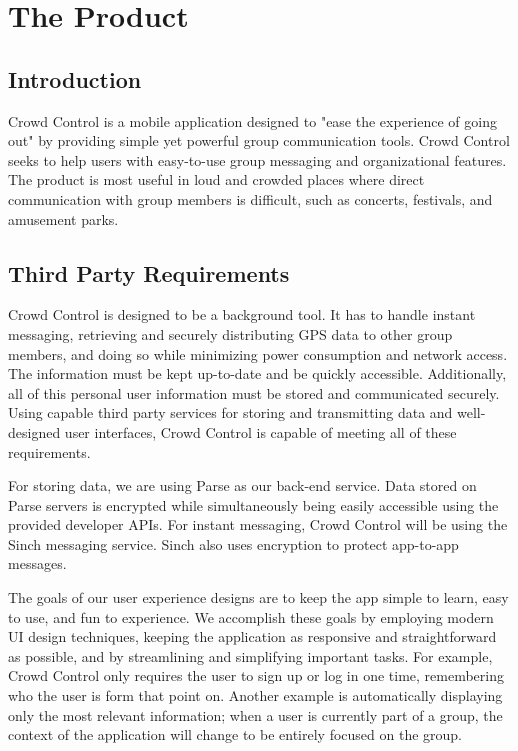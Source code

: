 


\renewcommand{\familydefault}{\sfdefault}
\renewcommand{\arraystretch}{1.5}

\chapter{The Product}
\section{Introduction}
Crowd Control is a mobile application designed to "ease the experience of going out" by providing
simple yet powerful group communication tools. Crowd Control seeks to help users with easy-to-use
group messaging and organizational features. The product is most useful in loud and crowded places
where direct communication with group members is difficult, such as concerts, festivals, and
amusement parks.



\section{Third Party Requirements}

Crowd Control is designed to be a background tool. It has to handle instant messaging, retrieving and
securely distributing GPS data to other group members, and doing so while minimizing power
consumption and network access. The information must be kept up-to-date and be quickly accessible.
Additionally, all of this personal user information must be stored and communicated securely. Using
capable third party services for storing and transmitting data and well-designed user interfaces, Crowd
Control is capable of meeting all of these requirements.

For storing data, we are using Parse as our back-end service. Data stored on Parse servers is
encrypted while simultaneously being easily accessible using the provided developer APIs. For instant
messaging, Crowd Control will be using the Sinch messaging service. Sinch also uses encryption to
protect app-to-app messages.

The goals of our user experience designs are to keep the app simple to learn, easy to use, and fun to
experience. We accomplish these goals by employing modern UI design techniques, keeping the
application as responsive and straightforward as possible, and by streamlining and simplifying
important tasks. For example, Crowd Control only requires the user to sign up or log in one time,
remembering who the user is form that point on. Another example is automatically displaying only the
most relevant information; when a user is currently part of a group, the context of the application will
change to be entirely focused on the group.\\

